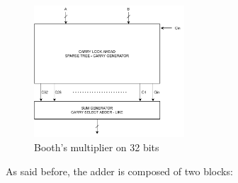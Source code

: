 \begin{figure}[h]
	\centering
	\includegraphics[width=0.5\textwidth]{chapters/5_ExecuteStage/images/P4.pdf}
	\caption{Booth's multiplier on 32 bits}
	\label{fig:P4}
\end{figure}
As said before, the adder is composed of two blocks:
